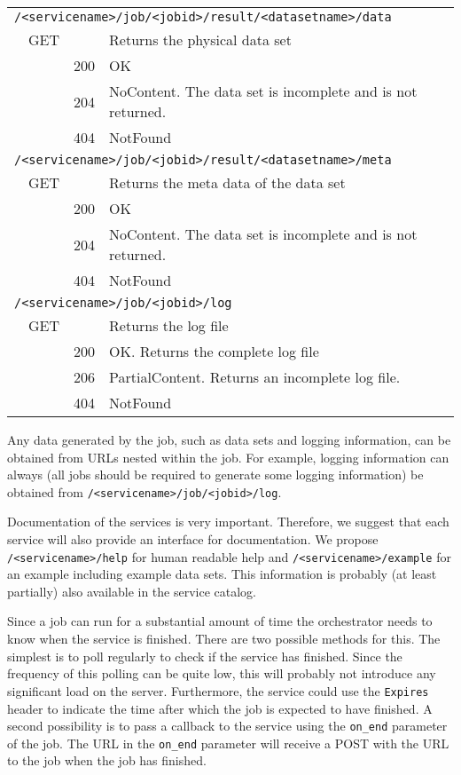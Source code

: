 \documentclass[a4paper]{article}
\begin{document}
\begin{table}
\begin{tabular}{l l l p{}}
    \multicolumn{4}{l}{\texttt{/<servicename>/job/<jobid>/result/<datasetname>/data}} \\
    & GET &    & Returns the physical data set \\
    &   & 200  & OK \\
    &   & 204  & NoContent. The data set is incomplete and is not returned. \\
    &   & 404  & NotFound \\

    \multicolumn{4}{l}{\texttt{/<servicename>/job/<jobid>/result/<datasetname>/meta}} \\
    & GET &    & Returns the meta data of the data set \\
    &   & 200  & OK \\
    &   & 204  & NoContent. The data set is incomplete and is not returned. \\
    &   & 404  & NotFound \\

    \multicolumn{4}{l}{\texttt{/<servicename>/job/<jobid>/log}} \\
    & GET &    & Returns the log file \\
    &   & 200  & OK. Returns the complete log file \\
    &   & 206  & PartialContent. Returns an incomplete log file. \\
    &   & 404  & NotFound \\
    \bottomrule
  \end{tabular}
\end{table}

Any data generated by the job, such as data sets and logging information, can be
obtained from URLs nested within the job. For example, logging information can
always (all jobs should be required to generate some logging information) be
obtained from \texttt{/<servicename>/job/<jobid>/log}. 

Documentation of the services is very important. Therefore, we suggest that each
service will also provide an interface for documentation. We propose
\texttt{/<servicename>/help} for human readable help and
\texttt{/<servicename>/example} for an example including example data sets. This
information is probably (at least partially) also available in the service catalog. 

Since a job can run for a substantial amount of time the orchestrator needs to
know when the service is finished. There are two possible methods for this. The
simplest is to poll regularly to check if the service has finished. Since the
frequency of this polling can be quite low, this will probably not introduce any
significant load on the server. Furthermore, the service could use the
\texttt{Expires} header to indicate the time after which the job is expected to
have finished. A second possibility is to pass a callback to the service using
the \texttt{on\_end} parameter of the job. The URL in the \texttt{on\_end}
parameter will receive a POST with the URL to the job when the job has finished. 
\end{document}
